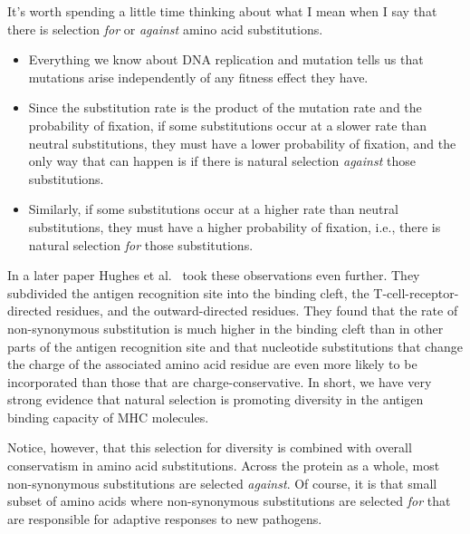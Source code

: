 \noindent It's worth spending a little time thinking about what I mean
when I say that there is selection {\it for\/} or {\it against\/}
amino acid substitutions.

\begin{itemize}

\item Everything we know about DNA replication and mutation tells us
  that mutations arise independently of any fitness effect they
  have.

\item Since the substitution rate is the product of the mutation rate
  and the probability of fixation, if some substitutions occur at a
  slower rate than neutral substitutions, they must have a lower
  probability of fixation, and the only way that can happen is if
  there is natural selection {\it against\/} those substitutions.

\item Similarly, if some substitutions occur at a higher rate than
  neutral substitutions, they must have a higher probability of
  fixation, i.e., there is natural selection {\it for\/} those
  substitutions. 

\end{itemize}

In a later paper Hughes et al.~\cite{Hughes-etal90} took these
observations even further. They subdivided the antigen recognition
site into the binding cleft, the T-cell-receptor-directed residues,
and the outward-directed residues. They found that the rate of
non-synonymous substitution is much higher in the binding cleft than
in other parts of the antigen recognition site and that nucleotide 
substitutions that change the charge of the associated amino acid
residue are even more likely to be incorporated than those that are
charge-conservative. In short, we have very strong evidence that
natural selection is promoting diversity in the antigen binding
capacity of MHC molecules.

Notice, however, that this selection for diversity is combined with
overall conservatism in amino acid substitutions. Across the protein
as a whole, most non-synonymous substitutions are selected {\it
against}. Of course, it is that small subset of amino acids where
non-synonymous substitutions are selected {\it for} that are
responsible for adaptive responses to new pathogens.

\vfill

